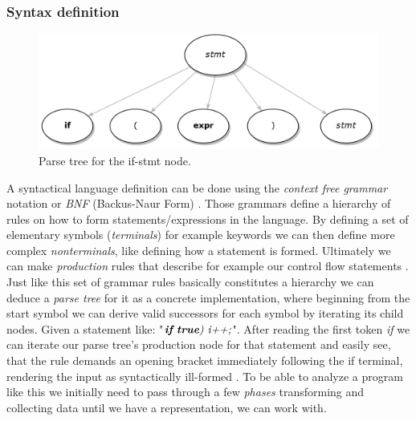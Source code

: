\subsubsection{Syntax definition}
\begin{figure}
	\begin{center}
		\includegraphics[width=.32\textwidth, height=0.12\textheight]{PICs/parse_tree}
	\end{center}
	\caption{Parse tree for the if-stmt node.}\label{parse_tree}
\end{figure}
\vspace{-0.5cm}
A syntactical language definition can be done using the \textit{context free grammar} notation or \textit{BNF} (Backus-Naur Form) . Those grammars define a hierarchy of rules on how to form statements/expressions in the language. By defining a set of elementary symbols (\textit{terminals}) for example keywords we can then define more complex \textit{nonterminals}, like defining how a statement is formed. Ultimately we can make \textit{production} rules that describe for example our control flow statements . Just like this set of grammar rules basically constitutes a hierarchy we can deduce a \textit{parse tree} for it as a concrete implementation, where beginning from the start symbol we can derive valid successors for each symbol by iterating its child nodes. Given a statement like: "$\textit{\textbf{if} \textbf{true}) i++;}$". After reading the first token \textit{if} we can iterate our parse tree's production node for that statement and easily see, that the rule demands an opening bracket immediately following the if terminal, rendering the input as syntactically ill-formed . To be able to analyze a program like this we initially need to pass through a few \textit{phases} transforming and collecting data until we have a representation, we can work with.

